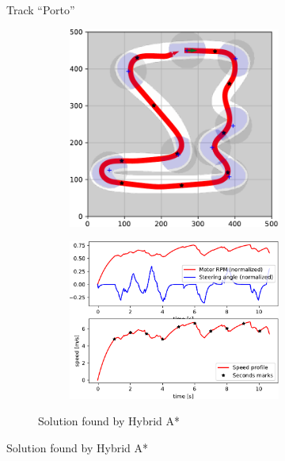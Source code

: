 \begin{figure}[!tbp]
	\vspace{0.5cm}
	
	\caption{Track ``Porto''}
	\label{fig:porto}
\end{figure}


\begin{figure}[!tbp]%
	\centering
	
	\begin{subfigure}[t]{\textwidth}
		\begin{subfigure}[c]{0.54\textwidth}
			\includegraphics[width=\textwidth]{../img/experiments/tornado-hybrid_astar-trajectory}
		\end{subfigure}
		\hfill
		\begin{subfigure}[c]{0.45\textwidth}
			\includegraphics[width=\textwidth]{../img/experiments/tornado-hybrid_astar-actuators}
		\end{subfigure}
		\caption{Solution found by Hybrid A*}
		\label{fig:solution_tornado-hybrid_astar}	
	\end{subfigure}
	

\end{figure}
